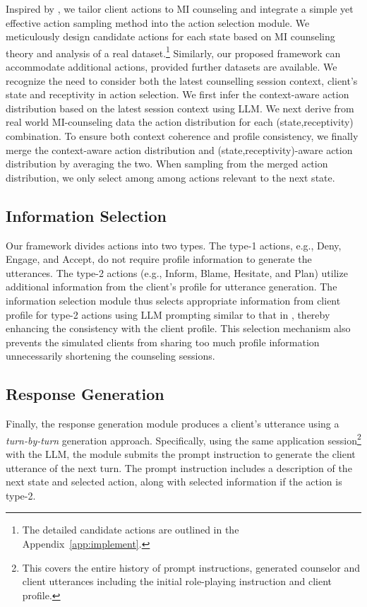 Inspired by \citet{dutt2021resper}, we tailor client actions to MI counseling and integrate a simple yet effective action sampling method into the action selection module. We meticulously design candidate actions for each state based on MI counseling theory and analysis of a real dataset.\footnote{The detailed candidate actions are outlined in the Appendix~\ref{app:implement}.} Similarly, our proposed framework can accommodate additional actions, provided further datasets are available. We recognize the need to consider both the latest counselling session context, client's state and receptivity in action selection. We first infer the context-aware action distribution based on the latest session context using LLM. We next derive from real world MI-counseling data the action distribution for each (state,receptivity) combination. To ensure both context coherence and profile consistency, we finally merge the context-aware action distribution and (state,receptivity)-aware action distribution by averaging the two.  When sampling from the merged action distribution, we only select among among actions relevant to the next state.

\subsection{Information Selection}
\label{sec:information selection}

Our framework divides actions into two types. The type-1 actions, e.g., Deny, Engage, and Accept, do not require profile information to generate the utterances. The type-2 actions (e.g., Inform, Blame, Hesitate, and Plan) utilize additional information from the client's profile for utterance generation. The information selection module thus selects appropriate information from client profile for type-2 actions using LLM prompting similar to that in \citet{tu2023characterchat}, thereby enhancing the consistency with the client profile. This selection mechanism also prevents the simulated clients from sharing too much profile information unnecessarily shortening the counseling sessions.

\subsection{Response Generation}
\label{sec:response generation}

Finally, the response generation module produces a client's utterance using a {\em turn-by-turn} generation approach. Specifically, using the same application session\footnote{This covers the entire history of prompt instructions, generated counselor and client utterances including the initial role-playing instruction and client profile.} with the LLM, the module submits the prompt instruction to generate the client utterance of the next turn.  The prompt instruction includes a description of the next state and selected action, along with selected information if the action is type-2. 


